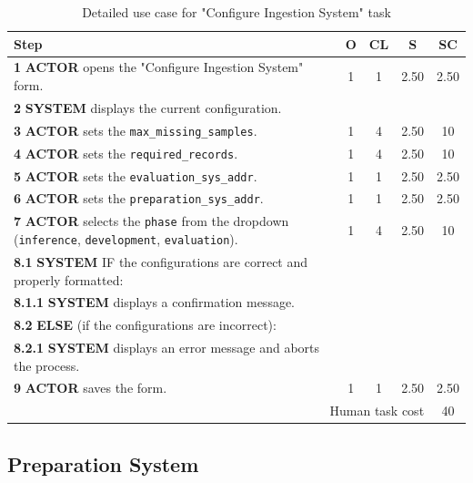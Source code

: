 \begin{table}[H]
    \centering
    \begin{tabularx}{\textwidth}{|X|c|c|c|c|}
    \hline
    \textbf{Step} & \textbf{O} & \textbf{CL} & \textbf{S} & \textbf{SC} \\
    \hline
    \textbf{1} \textbf{ACTOR} opens the "Configure Ingestion System" form. & 1 & 1  & 2.50 & 2.50 \\
    \hline
    \textbf{2} \textbf{SYSTEM} displays the current configuration. &  & &&  \\
    \hline
    \textbf{3} \textbf{ACTOR} sets the \texttt{max\_missing\_samples}. & 1 & 4  & 2.50 & 10 \\
    \hline
    \textbf{4} \textbf{ACTOR} sets the \texttt{required\_records}. & 1 & 4 & 2.50 & 10 \\
    \hline
    \textbf{5} \textbf{ACTOR} sets the \texttt{evaluation\_sys\_addr}. & 1 & 1  & 2.50 & 2.50 \\
    \hline
    \textbf{6} \textbf{ACTOR} sets the \texttt{preparation\_sys\_addr}. & 1 & 1  & 2.50 & 2.50 \\
    \hline
    \textbf{7} \textbf{ACTOR} selects the \texttt{phase} from the dropdown (\texttt{inference}, \texttt{development}, \texttt{evaluation}). & 1 & 4  & 2.50 & 10 \\
    \hline
    \textbf{8.1} \textbf{SYSTEM} IF the configurations are correct and properly formatted: &  &  &  &  \\
    \hline
    \textbf{8.1.1} \textbf{SYSTEM} displays a confirmation message. &  &  &  &  \\
    \hline
    \textbf{8.2} \textbf{ELSE} (if the configurations are incorrect): &  &  &  &  \\
    \hline
    \textbf{8.2.1} \textbf{SYSTEM} displays an error message and aborts the process. &  &  &  &  \\
    \hline
    \textbf{9} \textbf{ACTOR} saves the form. & 1 & 1  & 2.50 & 2.50 \\
    \hline
    \multicolumn{4}{|r|}{Human task cost} & 40 \\
    \hline
    \end{tabularx}
    \caption{Detailed use case for "Configure Ingestion System" task}
    \label{table:configure_ingestion_system}
    \end{table} 

\subsection{Preparation System}

